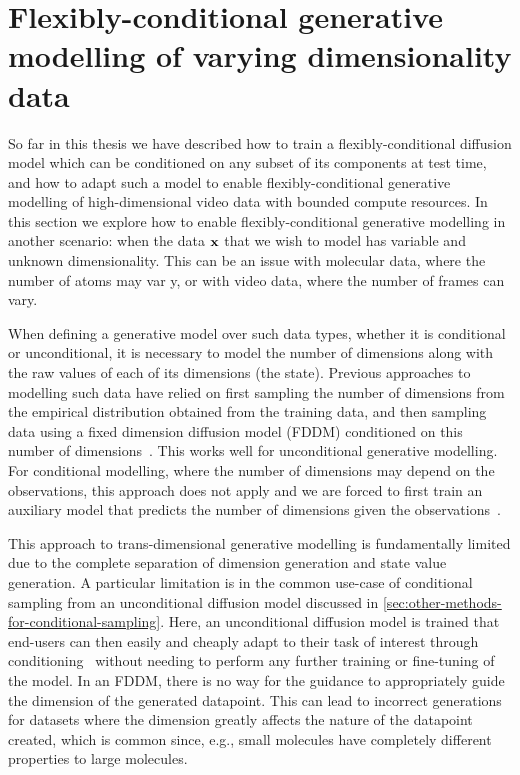 \newtheorem{proposition}{Proposition}
\newtheorem{lemma}{Lemma}
\newtheorem{assumption}{Assumption}

\chapter{Flexibly-conditional generative modelling of varying dimensionality data}
\label{ch:tddm}

So far in this thesis we have described how to train a flexibly-conditional diffusion model which can be conditioned on any subset of its components at test time, and how to adapt such a model to enable flexibly-conditional generative modelling of high-dimensional video data with bounded compute resources. In this section we explore how to enable flexibly-conditional generative modelling in another scenario: when the data ${\mathbf{x}}$ that we wish to model has variable and unknown dimensionality. This can be an issue with molecular data, where the number of atoms may var y, or with video data, where the number of frames can vary. 

When defining a generative model over such data types, whether it is conditional or unconditional, it is necessary to model the number of dimensions along with the raw values of each of its dimensions (the state). Previous approaches to modelling such data have relied on first sampling the number of dimensions from the empirical distribution obtained from the training data, and then sampling data using a fixed dimension diffusion model (FDDM) conditioned on this number of dimensions~\citep{hoogeboom2022equivariant}. This works well for unconditional generative modelling. For conditional modelling, where the number of dimensions may depend on the observations, this approach does not apply and we are forced to first train an auxiliary model that predicts the number of dimensions given the observations~\citep{igashov2022equivariant}.

This approach to trans-dimensional generative modelling is fundamentally limited due to the complete separation of dimension generation and state value generation. A particular limitation is in the common use-case of conditional sampling from an unconditional diffusion model discussed in \cref{sec:other-methods-for-conditional-sampling}. Here, an unconditional diffusion model is trained that end-users can then easily and cheaply adapt to their task of interest through conditioning~\citep{song2020score, dhariwal2021diffusion, clip_guided_diffusion, zhang2023towards} without needing to perform any further training or fine-tuning of the model. In an FDDM, there is no way for the guidance to appropriately guide the dimension of the generated datapoint. This can lead to incorrect generations for datasets where the dimension greatly affects the nature of the datapoint created, which is common since, e.g., small molecules have completely different properties to large molecules.

